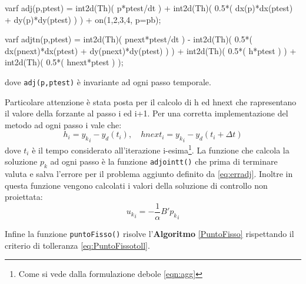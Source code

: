 \begin{Code}[caption={Matrici \texttt{adj(w,wtest)} e \texttt{adjtn(w,wtest)}}]
varf adj(p,ptest) =   int2d(Th)( p*ptest/dt )			
					+ int2d(Th)( 0.5*( dx(p)*dx(ptest) + dy(p)*dy(ptest) ) ) 
				    + on(1,2,3,4, p=pb);

varf adjtn(p,ptest) =   int2d(Th)( pnext*ptest/dt )
    				  - int2d(Th)( 0.5*( dx(pnext)*dx(ptest) + dy(pnext)*dy(ptest) ) ) 
  					  + int2d(Th)( 0.5*( h*ptest ) ) 
  					  + int2d(Th)( 0.5*( hnext*ptest ) ); 
\end{Code}
dove \texttt{adj(p,ptest)} è invariante ad ogni passo temporale.
\par
Particolare attenzione è stata posta per il calcolo di h ed hnext che rapresentano il valore della forzante al passo i ed i+1. Per una corretta implementazione del metodo ad ogni passo i vale che:
\begin{equation}
h_i = {y_k}_i - y_d(t_i), \quad
hnext_i = {y_k}_i - y_d(t_i+{\Delta}t)
\label{hhnext}
\end{equation}
dove $t_i$ è il tempo considerato all'iterazione i-esima\footnote{Come si vede dalla formulazione debole \eqref{eqn:agg}}.
La funzione che calcola la soluzione $p_k$ ad ogni passo è la funzione \texttt{adjointt()} che prima di terminare valuta e salva l'errore per il problema aggiunto definito da \eqref{eq:erradj}. Inoltre in questa funzione vengono calcolati i valori della soluzione di controllo non proiettata:
\begin{equation}
{u_k}_i = -\frac{1}{\alpha}B'{p_k}_i  %
\label{unp}
\end{equation}
\par
Infine la funzione \texttt{puntoFisso()} risolve l'\textbf{Algoritmo} \ref{PuntoFisso} rispettando il criterio di tolleranza \eqref{eq:PuntoFissotoll}.

